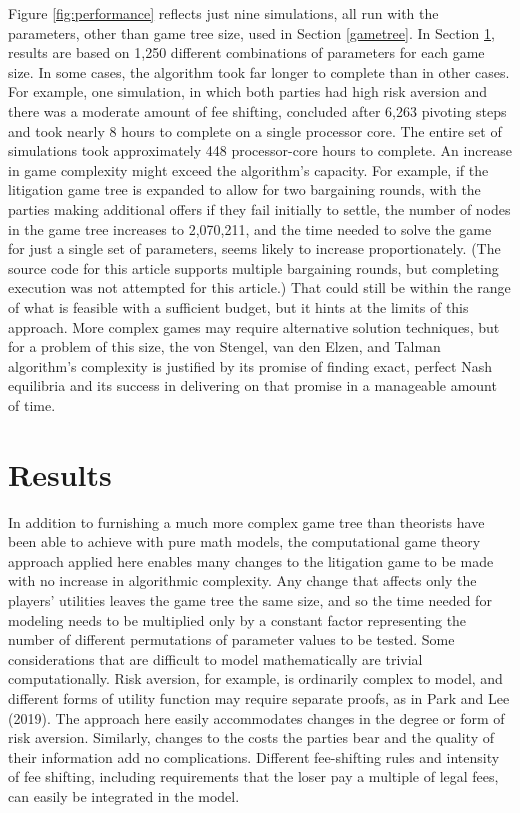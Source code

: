 \documentclass{article}
\begin{document}
Figure \ref{fig:performance} reflects just nine simulations, all run with the parameters, other than game tree size, used in Section \ref{gametree}. In Section \ref{results}, results are based on 1,250 different combinations of parameters for each game size. In some cases, the algorithm took far longer to complete than in other cases. For example, one simulation, in which both parties had high risk aversion and there was a moderate amount of fee shifting, concluded after 6,263 pivoting steps and took nearly 8 hours to complete on a single processor core. The entire set of simulations took approximately 448 processor-core hours to complete. An increase in game complexity might exceed the algorithm's capacity. For example, if the litigation game tree is expanded to allow for two bargaining rounds, with the parties making additional offers if they fail initially to settle, the number of nodes in the game tree increases to 2,070,211, and the time needed to solve the game for just a single set of parameters, seems likely to increase proportionately. (The source code for this article supports multiple bargaining rounds, but completing execution was not attempted for this article.) That could still be within the range of what is feasible with a sufficient budget, but it hints at the limits of this approach. More complex games may require alternative solution techniques, but for a problem of this size, the von Stengel, van den Elzen, and Talman algorithm's complexity is justified by its promise of finding exact, perfect Nash equilibria and its success in delivering on that promise in a manageable amount of time. 

\section{Results} \label{results}

In addition to furnishing a much more complex game tree than theorists have been able to achieve with pure math models, the computational game theory approach applied here enables many changes to the litigation game to be made with no increase in algorithmic complexity. Any change that affects only the players' utilities leaves the game tree the same size, and so the time needed for modeling needs to be multiplied only by a constant factor representing the number of different permutations of parameter values to be tested. Some considerations that are difficult to model mathematically are trivial computationally. Risk aversion, for example, is ordinarily complex to model, and different forms of utility function may require separate proofs, as in Park and Lee (2019). The approach here easily accommodates changes in the degree or form of risk aversion. Similarly, changes to the costs the parties bear and the quality of their information add no complications. Different fee-shifting rules and intensity of fee shifting, including requirements that the loser pay a multiple of legal fees, can easily be integrated in the model. 
\end{document}
